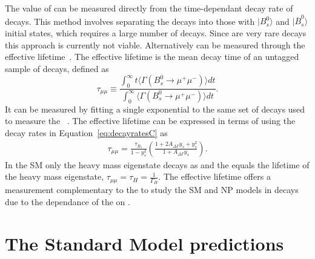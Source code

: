 The value of \ADG can be measured directly from the time-dependant decay rate of \bsmumu decays. This method involves separating the \bsmumu decays into those with $| B^0_s \rangle$ and $|\overline{B}^0_s\rangle$ initial states, which requires a large number of \bsmumu decays. Since \bsmumu are very rare decays this approach is currently not viable. Alternatively \ADG can be measured through the \bsmumu effective lifetime~\cite{DeBruyn:2012wj}. The effective lifetime is the mean decay time of an untagged sample of \bsmumu decays, defined as~\cite{Fleischer:2011cw}
\begin{equation}
  \tau_{\mu\mu} \equiv \frac{\int^{\infty}_0 t \langle \Gamma (B^0_s \to \mu^+ \mu^-) \rangle dt}{\int^{\infty}_0 \langle \Gamma (B^0_s \to\mu^+ \mu^-) \rangle dt}.
\label{eq:EL_def}
\end{equation}
It can be measured by fitting a single exponential to the same set of decays used to measure the \BF~\cite{DeBruyn:2012wj}. The effective lifetime can be expressed in terms of \ADG using the decay rates in Equation~\ref{eq:decayratesC} as
\begin{align}
\tau_{\mu\mu} %
= \frac{\tau_{B_{s}}}{1 - y_{s}^{2}} \left ( \frac{ 1 + 2A_{\Delta\Gamma}y_{s} + y_{s}^{2}}{1 + A_{\Delta\Gamma}y_{s}} \right).
\label{eq:lifetimedef}
\end{align}
In the SM only the heavy \bs mass eigenstate decays as \bsmumu and the \el equals the lifetime of the heavy mass eigenstate, $\tau_{\mu\mu} = \tau_H = \frac{1}{\Gamma_H}$. The effective lifetime offers a measurement complementary to the \BFs to study the SM and NP models in \bsmumu decays due to the dependance of the \el on \ADG.

\section{The Standard Model predictions}
\label{sec:SM_predictions}

